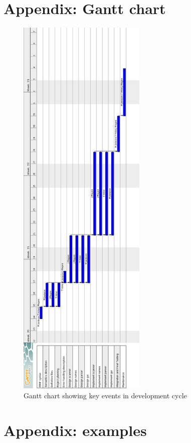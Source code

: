 \documentclass[a4paper,10pt]{article}
\begin{document}
\section{Appendix: Gantt chart}
\label{appendix:gantt}
\begin{figure}[h]
 \centering
  \includegraphics[height=19cm]{Gantt-Chart.png}
 \caption{Gantt chart showing key events in development cycle}
 \label{fig:ganttchart}
\end{figure}

\clearpage

\section{Appendix: examples}
\end{document}
